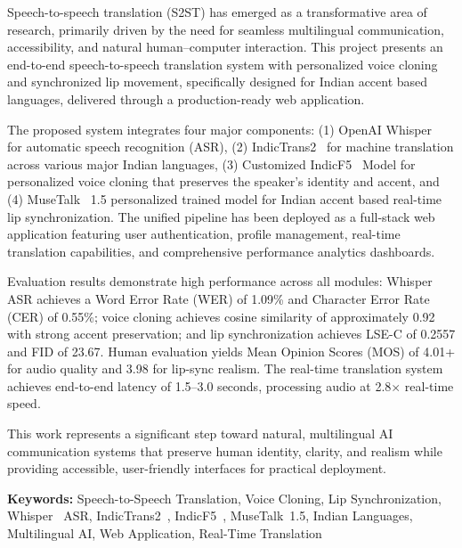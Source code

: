 \documentclass[12pt,oneside]{report}
\begin{document}
Speech-to-speech translation (S2ST) has emerged as a transformative area of research, primarily driven by the need for seamless multilingual communication, accessibility, and natural human--computer interaction. This project presents an end-to-end speech-to-speech translation system with personalized voice cloning and synchronized lip movement, specifically designed for Indian accent based languages, delivered through a production-ready web application.

The proposed system integrates four major components: (1) OpenAI Whisper~\cite{radford2023whisper} for automatic speech recognition (ASR), (2) IndicTrans2~\cite{gala2023indictrans2} for machine translation across various major Indian languages, (3) Customized IndicF5~\cite{indicf5_2025} Model for personalized voice cloning that preserves the speaker's identity and accent, and (4) MuseTalk~\cite{zhang2023musetalk} 1.5 personalized trained model for Indian accent based real-time lip synchronization. The unified pipeline has been deployed as a full-stack web application featuring user authentication, profile management, real-time translation capabilities, and comprehensive performance analytics dashboards.

Evaluation results demonstrate high performance across all modules: Whisper~\cite{radford2023whisper} ASR achieves a Word Error Rate (WER) of 1.09\% and Character Error Rate (CER) of 0.55\%; voice cloning achieves cosine similarity of approximately 0.92 with strong accent preservation; and lip synchronization achieves LSE-C of 0.2557 and FID of 23.67. Human evaluation yields Mean Opinion Scores (MOS) of 4.01+ for audio quality and 3.98 for lip-sync realism. The real-time translation system achieves end-to-end latency of 1.5--3.0 seconds, processing audio at 2.8$\times$ real-time speed.

This work represents a significant step toward natural, multilingual AI communication systems that preserve human identity, clarity, and realism while providing accessible, user-friendly interfaces for practical deployment.

\textbf{Keywords:} Speech-to-Speech Translation, Voice Cloning, Lip Synchronization, Whisper~\cite{radford2023whisper} ASR, IndicTrans2~\cite{gala2023indictrans2}, IndicF5~\cite{indicf5_2025}, MuseTalk~\cite{zhang2023musetalk}1.5, Indian Languages, Multilingual AI, Web Application, Real-Time Translation

\newpage

\end{document}
